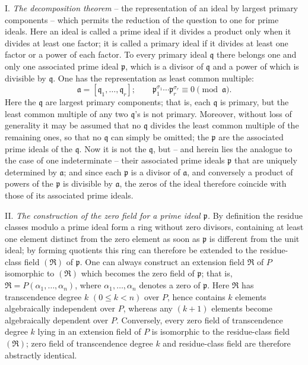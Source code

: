 \documentclass[11pt]{article}
\begin{document}
I. \emph{The decomposition theorem} -- the representation of an ideal by largest primary components -- which permits the reduction of the question to one for prime ideals. Here an ideal is called a prime ideal if it divides a product only when it divides at least one factor; it is called a primary ideal if it divides at least one factor or a power of each factor. To every primary ideal $\mathfrak q$ there belongs one and only one associated prime ideal $\mathfrak p$, which is a divisor of $\mathfrak q$ and a power of which is divisible by $\mathfrak q$. One has the representation as least common multiple:
\[
 \mathfrak a=[\mathfrak q_1,\ldots,\mathfrak q_r];\qquad
 \mathfrak p_1^{\sigma_1}\cdots \mathfrak p_r^{\sigma_r}\equiv 0\pmod{\mathfrak a}.
\]
Here the $\mathfrak q$ are largest primary components; that is, each $\mathfrak q$ is primary, but the least common multiple of any two $\mathfrak q$'s is not primary. Moreover, without loss of generality it may be assumed that no $\mathfrak q$ divides the least common multiple of the remaining ones, so that no $\mathfrak q$ can simply be omitted; the $\mathfrak p$ are the associated prime ideals of the $\mathfrak q$. Now it is not the $\mathfrak q$, but -- and herein lies the analogue to the case of one indeterminate -- their associated prime ideals $\mathfrak p$ that are uniquely determined by $\mathfrak a$; and since each $\mathfrak p$ is a divisor of $\mathfrak a$, and conversely a product of powers of the $\mathfrak p$ is divisible by $\mathfrak a$, the zeros of the ideal therefore coincide with those of its associated prime ideals.

II. \emph{The construction of the zero field for a prime ideal $\mathfrak p$.} By definition the residue classes modulo a prime ideal form a ring without zero divisors, containing at least one element distinct from the zero element as soon as $\mathfrak p$ is different from the unit ideal; by forming quotients this ring can therefore be extended to the residue-class field $(\mathfrak R)$ of $\mathfrak p$. One can always construct an extension field $\mathfrak R$ of $P$ isomorphic to $(\mathfrak R)$ which becomes the zero field of $\mathfrak p$; that is, $\mathfrak R=P(\alpha_1,\ldots,\alpha_n)$, where $\alpha_1,\ldots,\alpha_n$ denotes a zero of $\mathfrak p$. Here $\mathfrak R$ has transcendence degree $k$ $(0\leq k<n)$ over $P$, hence contains $k$ elements algebraically independent over $P$, whereas any $(k+1)$ elements become algebraically dependent over $P$. Conversely, every zero field of transcendence degree $k$ lying in an extension field of $P$ is isomorphic to the residue-class field $(\mathfrak R)$; zero field of transcendence degree $k$ and residue-class field are therefore abstractly identical.
\end{document}
